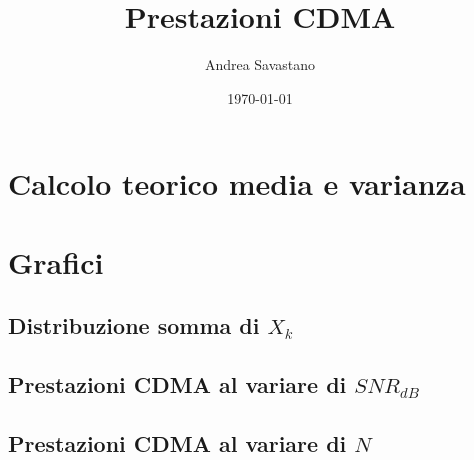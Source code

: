 \documentclass[12pt, a4paper]{article}
\title{Prestazioni CDMA}
\author{Andrea Savastano}
\date{\today}
\newcommand{\disablelinkcolor}{%
	\hypersetup{linkcolor=black}%
}
\begin{document}
	\disablelinkcolor	
	\maketitle
	\thispagestyle{empty}
	\tableofcontents
	
	\newpage
	\section{Calcolo teorico media e varianza}
	
	
	\newpage
	\section{Grafici}
	\subsection{Distribuzione somma di \(X_k\)}
	
	
	\newpage
	\subsection{Prestazioni CDMA al variare di \(SNR_{dB}\)}
	
	
	\newpage
	\subsection{Prestazioni CDMA al variare di \(N\)}
	
	
\end{document}
